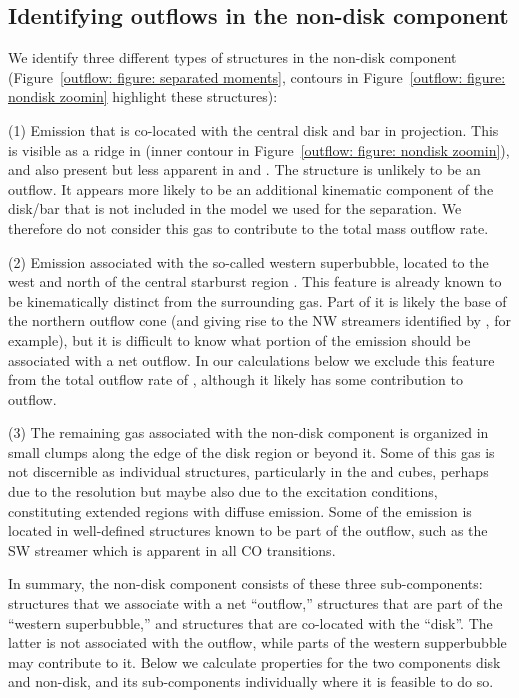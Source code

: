 
\subsection{Identifying  outflows in the non-disk component}

We identify three different types of structures in the non-disk component (Figure~\ref{outflow: figure: separated moments}, contours in Figure~\ref{outflow: figure: nondisk zoomin} highlight these structures): 

(1) Emission that is co-located with the central disk and bar in projection. This is visible as a ridge in  (inner contour in Figure~\ref{outflow: figure: nondisk zoomin}), and also present but less apparent in  and . The structure is unlikely to be an outflow. It appears more likely to be an additional kinematic component of the disk/bar that is not included in the model we used for the separation. We therefore do not consider this gas to contribute to the total mass outflow rate. 

(2) Emission associated with the so-called western superbubble, located to the west and north of the central starburst region \citep[][shown by the western contour in Figure~\ref{outflow: figure: nondisk zoomin}]{2006ApJ...636..685S,2013Natur.499..450B}. This feature is already known to be kinematically distinct from the surrounding gas. Part of it is likely the base of the northern outflow cone (and giving rise to the NW streamers identified by \citeauthor{2013Natur.499..450B}, for example), but it is difficult to know what portion of the emission should be associated with a net outflow. 
In our calculations below we exclude this feature from the total outflow rate of , although it likely has some contribution to outflow.

(3) The remaining gas associated with the non-disk component is organized in small clumps along the edge of the disk region or beyond it. Some of this gas is not discernible as individual structures, particularly in the  and  cubes, perhaps due to the resolution but maybe also due to the excitation conditions, constituting extended regions with diffuse emission. Some of the emission is located in well-defined structures known to be part of the outflow, such as the SW streamer which is apparent in all CO transitions.

In summary, the non-disk component consists of these three sub-components: structures that we associate with a net ``outflow,'' structures that are part of the ``western superbubble,'' and structures that are co-located with the ``disk''. The latter is not associated with the outflow, while parts of the western supperbubble may contribute to it. Below we calculate properties for the two components disk and non-disk, and its sub-components individually where it is feasible to do so.


